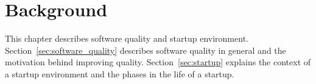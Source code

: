 
 \chapter{Background}
 
This chapter describes software quality and startup environment. Section~\ref{sec:software_quality} describes software quality in general and the motivation behind improving quality. Section~\ref{sec:startup} explains the context of a startup environment and the phases in the life of a startup.

 


